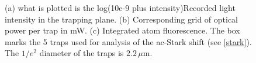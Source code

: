 \documentclass[../Thesis-IJspeert.tex]{subfiles}
\begin{document}
\begin{figure}[t]
\begin{subfigure}[b]{.23\linewidth}
		\centering
		\caption{}
		\label{c}
	\end{subfigure}
	\begin{subfigure}[b]{.23\linewidth}
		\centering
		\caption{}
		\label{c}
	\end{subfigure}
	\caption{(a) what is plotted is the log(10e-9 plus intensity)Recorded light intensity in the trapping plane. (b) Corresponding grid of optical power per trap in mW. (c) Integrated atom fluorescence. The box marks the 5 traps used for analysis of the ac-Stark shift (see \autoref{stark}). The $1/e^2$ diameter of the traps is $2.2\,\mu$m.}
\end{figure}
\end{document}
